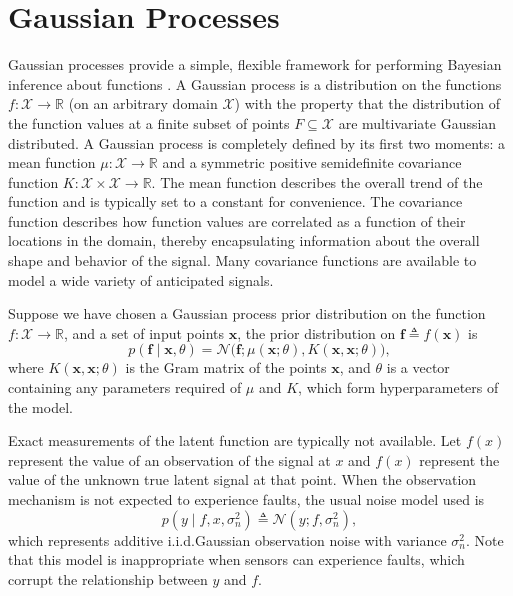 \documentclass{article} %
\newcommand{\R}{\ensuremath{\mathbb{R}}}
\newcommand{\deq}{\ensuremath{\triangleq}}
\newcommand{\given}{\!\ensuremath{\mid}\!}
\newcommand{\cm}[1]{\ensuremath{\mathcal{#1}}}
\newcommand{\bm}[1]{\ensuremath{\mathbf{#1}}}
\begin{document}
\section{Gaussian Processes}

Gaussian processes provide a simple, flexible framework for performing
Bayesian inference about functions \citep{gpml}.  A Gaussian process
is a distribution on the functions $f\colon \cm{X} \to \R$ (on an
arbitrary domain $\cm{X}$) with the property that the distribution of
the function values at a finite subset of points $F \subseteq \cm{X}$
are multivariate Gaussian distributed. A Gaussian process is completely defined by its first two moments: a
mean function $\mu\colon \cm{X} \to \R$ and a symmetric positive
semidefinite covariance function $K\colon \cm{X} \times \cm{X} \to
\R$.  The mean function describes the overall trend of the function
and is typically set to a constant for convenience.  The covariance
function describes how function values are correlated as a function of
their locations in the domain, thereby encapsulating information about
the overall shape and behavior of the signal.  Many covariance
functions are available to model a wide variety of anticipated
signals.

Suppose we have chosen a Gaussian process prior distribution on the
function $f\colon \cm{X} \to \R$, and a set of input points $\bm{x}$,
the prior distribution on $\bm{f} \deq f(\bm{x})$ is
\begin{equation*}
 p(\bm{f} \given \bm{x}, \theta)
 =
 \cm{N}
 \bigl(
   \bm{f};
   \mu(\bm{x}; \theta),
   K(\bm{x}, \bm{x}; \theta)
 \bigr),
\end{equation*}
where $K(\bm{x}, \bm{x}; \theta)$ is the Gram matrix of the points
$\bm{x}$, and $\theta$ is a vector containing any parameters required
of $\mu$ and $K$, which form hyperparameters of the model.

Exact measurements of the latent function are typically not available.
Let $f(x)$ represent the
value of an observation of the signal at $x$ and $f(x)$
represent the value of the unknown true latent signal at that point.
When the observation mechanism is not expected to experience faults,
the usual noise model used is
\begin{equation}\label{iidnoise}
 p(y \given f, x, \sigma_n^2)
 \deq
 \cm{N}(y; f, \sigma_n^2),
\end{equation}
which represents additive i.i.d.\space Gaussian observation noise with
variance $\sigma_n^2$. Note that this model is inappropriate when
sensors can experience faults, which corrupt the relationship
between $y$ and $f$.
\end{document}

